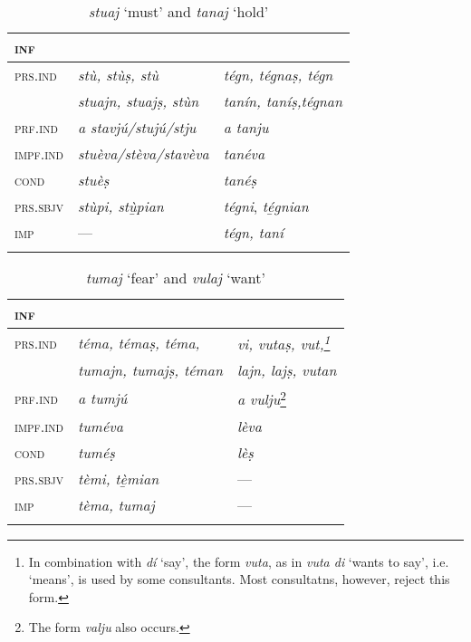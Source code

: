 \begin{table}
\small
	\caption{\textit{stuaj} `must' and \textit{tanaj} `hold'}

	\begin{tabular}{lll}
		\lsptoprule
		\textsc{inf} & \isi{\textit{\textbf{stuaj}}} & \isi{\textbf{\textit{tanaj}}}\\
		\midrule
		\textsc{prs.ind} & \textit{stù, stùṣ, stù} & \textit{tégn, tégnaṣ, tégn}\\
		& \textit{stuajn, stuajṣ, stùn} & \textit{tanín, taníṣ,tégnan}\\
		\textsc{prf.ind} & \textit{a stavjú/stujú/stju} & \textit{a tanju}\\
		\textsc{impf.ind} & \textit{stuèva/stèva/stavèva} & \textit{tanéva}\\
		\textsc{cond} & \textit{stuèṣ} & \textit{tanéṣ}\\
		\textsc{prs.sbjv} & \textit{stùpi, stù̱pian} & \textit{tégni}, \textit{té̱gnian}\\
		\textsc{imp} & --- & \textit{tégn, taní}\\
		\lspbottomrule
	\end{tabular}
\end{table}

\begin{table}
\small
	\caption{\textit{tumaj} `fear'  and \textit{vulaj} `want'}

	\begin{tabular}{lll}
		\lsptoprule
		\textsc{inf} & \isi{\textit{\textbf{tumaj}}} & \isi{\textit{\textbf{vulaj}}}\\
		\midrule
		\textsc{prs.ind} & \textit{téma, témaṣ, téma,} & \textit{vi, vutaṣ, vut,\footnote{In combination with \textit{dí} `say', the form \textit{vuta}, as in \textit{vuta di} `wants to say', i.e. `means', is used by some consultants. Most consultatns, however, reject this form.}}\\
		& \textit{tumajn, tumajṣ, téman} & \textit{lajn, lajṣ, vutan} \\
		\textsc{prf.ind} & \textit{a tumjú} & \textit{a vulju}\footnote{The form \textit{valju} also occurs.}\\
		\textsc{impf.ind} & \textit{tuméva} & \textit{lèva}\\
		\textsc{cond} & \textit{tuméṣ} & \textit{lèṣ}\\
		\textsc{prs.sbjv} & \textit{tèmi, tè̱mian} & ---\\
		\textsc{imp} & \textit{tèma, tumaj} & ---\\
		\lspbottomrule
	\end{tabular}
\end{table}



